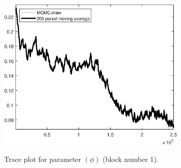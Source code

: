 \begin{figure}[H]
\centering
  \includegraphics[width=0.8\textwidth]{BRS_est_shopping/graphs/TracePlot_phi_blck_1}\\
    \caption{Trace plot for parameter $(\phi)$ (block number 1).}
\end{figure}
